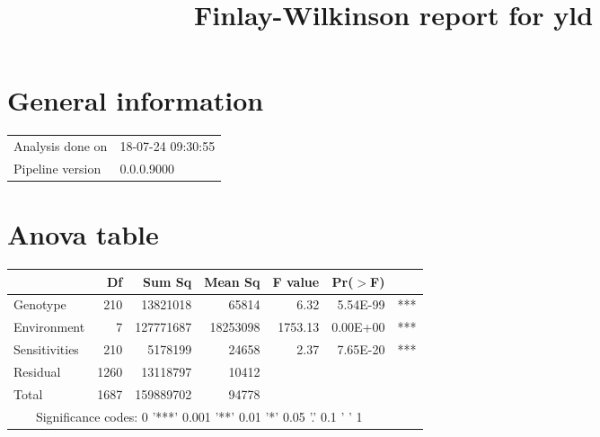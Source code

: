\documentclass[a4paper,11pt]{article}\usepackage[]{graphicx}\usepackage[]{color}
\title{Finlay-Wilkinson report for yld}%
\author{\vspace{-5ex}}
\date{\vspace{-5ex}}
\begin{document}
\maketitle
\singlespacing

\section{General information}
\begin{table}[ht]
\begin{flushleft}
\begin{tabular}{ll}
  Analysis done on & 18-07-24 09:30:55 \\ 
  Pipeline version & 0.0.0.9000 \\ 
  \end{tabular}
\label{general}
\end{flushleft}
\end{table}


\section{Anova table}

\begin{table}[ht]
\begin{flushleft}
\begin{tabular}{lrrrrrl}
  \hline
 & Df & Sum Sq & Mean Sq & F value & Pr($>$F) &  \\ 
  \hline
Genotype & 210 & 13821018 & 65814 & 6.32 & 5.54E-99 & *** \\ 
  Environment & 7 & 127771687 & 18253098 & 1753.13 & 0.00E+00 & *** \\ 
  Sensitivities & 210 & 5178199 & 24658 & 2.37 & 7.65E-20 & *** \\ 
  Residual & 1260 & 13118797 & 10412 &  &  &  \\ 
  Total & 1687 & 159889702 & 94778 &  &  &  \\ 
   \hline  \multicolumn{6}{c}{Significance codes:  0 '***' 0.001 '**' 0.01 '*' 0.05 '.' 0.1 ' ' 1} \\ \hline
\end{tabular}
\label{anova}
\end{flushleft}
\end{table}
\end{document}
